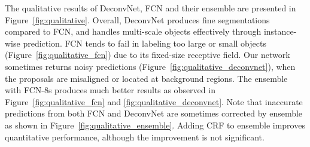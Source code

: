 \documentclass[10pt,twocolumn,letterpaper]{article}
\begin{document}
The qualitative results of DeconvNet, FCN and their ensemble are presented in Figure~\ref{fig:qualitative}. 
Overall, DeconvNet produces fine segmentations compared to FCN, and handles multi-scale objects effectively through instance-wise prediction.
FCN tends to fail in labeling too large or small objects (Figure~\ref{fig:qualitative_fcn}) due to its fixed-size receptive field.
Our network sometimes returns noisy predictions (Figure~\ref{fig:qualitative_deconvnet}), when the proposals are misaligned or located at background regions.
The ensemble with FCN-8s produces much better results as observed in Figure~\ref{fig:qualitative_fcn} and \ref{fig:qualitative_deconvnet}.
Note that inaccurate predictions from both FCN and DeconvNet are sometimes corrected by ensemble  as shown in Figure~\ref{fig:qualitative_ensemble}.
Adding CRF to ensemble improves quantitative performance, although the improvement is not significant. 


\iffalse
{\color{red}
[Discussion of qualitative results---
1)
2) comparisons to FCN---
The case our method do better than FCN
2-1) our method is better to capture fine details. 
2-2) our method is better to handle large scale variation in the object.
On the other hand, the case FCN do better than ours
2-3) FCN is better to capture overall shape---our method is noisy. 
3) the complementary characteristics of our method and FCN enables the improvement by ensemble.
]
}
\fi
\end{document}
